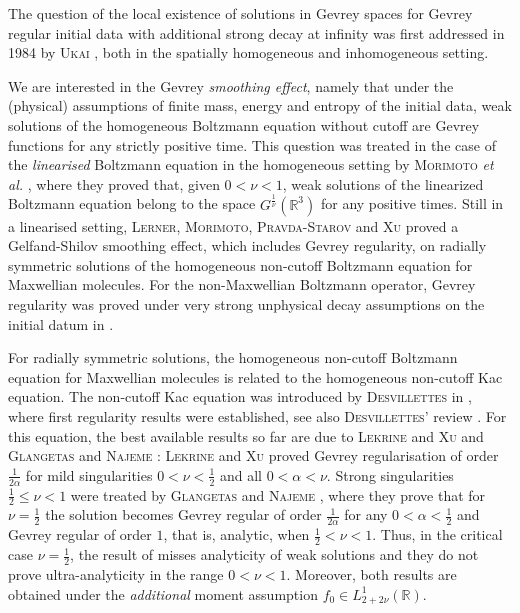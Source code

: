 \documentclass[11pt,a4paper,reqno]{amsart}
\theoremstyle{plain}
\theoremstyle{definition}
\begin{document}
\bigskip

The question of the local existence of solutions in Gevrey spaces for Gevrey regular initial data with additional strong decay at infinity was first addressed in 1984 by \textsc{Ukai} \cite{Uka84}, both in the spatially homogeneous and inhomogeneous setting.

We are interested in the Gevrey \emph{smoothing effect}, namely that under the (physical) assumptions of finite mass, energy and entropy of the initial data, weak solutions of the homogeneous Boltzmann equation without cutoff are Gevrey functions for any strictly positive time. This question was treated in the case of the \emph{linearised} Boltzmann equation in the homogeneous setting by \textsc{Morimoto} \textit{et al.} \cite{MUXY09}, where they proved that, given $0<\nu<1$,  weak solutions of the linearized Boltzmann equation belong to the space $G^{\frac{1}{\nu}}({\mathbb{R}}^3)$ for any  positive times.
Still in a linearised setting, \textsc{Lerner, Morimoto, Pravda-Starov} and \textsc{Xu} \cite{LMPX14} proved a Gelfand-Shilov smoothing effect, which includes Gevrey regularity, on radially symmetric solutions of the homogeneous non-cutoff Boltzmann equation for Maxwellian molecules. For the non-Maxwellian  Boltzmann operator, Gevrey regularity was proved under very strong unphysical decay assumptions on the initial datum in \cite{Lin14}.

For radially symmetric solutions, the homogeneous non-cutoff Boltzmann equation for Maxwellian molecules is related to the homogeneous non-cutoff Kac equation. The non-cutoff Kac equation was introduced by \textsc{Desvillettes} in \cite{Des95}, where first regularity results were established, see also \textsc{Desvillettes}' review \cite{Des03}. For this equation, the best available results so far are due to \textsc{Lekrine} and \textsc{Xu} \cite{LX09} and \textsc{Glangetas} and \textsc{Najeme} \cite{GN13}:  \textsc{Lekrine} and \textsc{Xu} \cite{LX09} proved Gevrey regularisation of order $\frac{1}{2\alpha}$ for mild singularities $0<\nu<\frac{1}{2}$ and all $0<\alpha<\nu$. Strong singularities $\tfrac{1}{2} \leq \nu<1$ were treated by \textsc{Glangetas} and \textsc{Najeme} \cite{GN13}, where they prove that for $\nu=\frac{1}{2}$ the solution becomes Gevrey regular of order $\frac{1}{2\alpha}$ for any $0<\alpha<\frac{1}{2}$ and Gevrey regular of order $1$, that is, analytic, when $\frac{1}{2}<\nu<1$. Thus, in the critical case $\nu=\frac{1}{2}$, the result of \cite{GN13} misses analyticity of weak solutions and they do not prove ultra-analyticity in the range $0<\nu<1$. Moreover, both results are obtained under the \emph{additional} moment assumption $f_0\in L^1_{2+2\nu}({\mathbb{R}})$.
\end{document}

